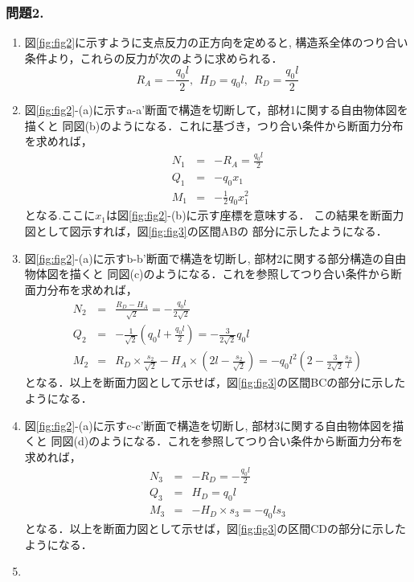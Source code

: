 ﻿\documentclass[10pt,a4j]{jarticle}
\begin{document}
\subsubsection*{問題2.}
\begin{enumerate}
\item
図\ref{fig:fig2}に示すように支点反力の正方向を定めると,
構造系全体のつり合い条件より，これらの反力が次のように求められる．
\begin{equation}
	R_A=-\frac{q_0l}{2}, \ \ 
	H_D=q_0l, \ \ 
	R_D=\frac{q_0l}{2}
\end{equation}
\item
図\ref{fig:fig2}-(a)に示すa-a'断面で構造を切断して，部材1に関する自由物体図を描くと
同図(b)のようになる．これに基づき，つり合い条件から断面力分布を求めれば，
\begin{eqnarray}
	N_1 &=&-R_A=\frac{q_0l}{2} \\
	Q_1 &=& -q_0x_1 \\ 
	M_1 &=&-\frac{1}{2} q_0x_1^2 
\end{eqnarray}
となる.ここに$x_1$は図\ref{fig:fig2}-(b)に示す座標を意味する．
この結果を断面力図として図示すれば，図\ref{fig:fig3}の区間ABの
部分に示したようになる．
\item
図\ref{fig:fig2}-(a)に示すb-b'断面で構造を切断し, 部材2に関する部分構造の自由物体図を描くと
同図(c)のようになる．これを参照してつり合い条件から断面力分布を求めれば，
\begin{eqnarray}
	N_2 &=& \frac{R_D-H_A}{\sqrt{2}}=-\frac{q_0l}{2\sqrt{2}} \\
	Q_2 &=&-\frac{1}{\sqrt{2}}\left(q_0l+\frac{q_0l}{2}\right) = -\frac{3}{2\sqrt{2}}q_0l \\
	M_2 &=& R_D\times \frac{s_2}{\sqrt{2}} -H_A\times \left(2l-\frac{s_2}{\sqrt{2}}\right)
	=
	-q_0l^2 \left( 2-\frac{3}{2\sqrt{2}}\frac{s_2}{l}\right)
\end{eqnarray}
となる．以上を断面力図として示せば，図\ref{fig:fig3}の区間BCの部分に示したようになる．
\item
図\ref{fig:fig2}-(a)に示すc-c'断面で構造を切断し, 部材3に関する自由物体図を描くと
同図(d)のようになる．これを参照してつり合い条件から断面力分布を求めれば，
\begin{eqnarray}
	N_3 &=&-R_D= -\frac{q_0l}{2} \\
	Q_3 &=& H_D=q_0l \\
	M_3 &=& -H_D\times s_3=-q_0ls_3
\end{eqnarray}
となる．以上を断面力図として示せば，図\ref{fig:fig3}の区間CDの部分に示したようになる．
\item

\end{enumerate}
\end{document}
